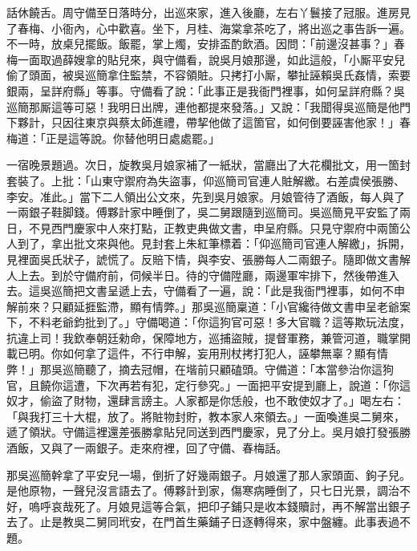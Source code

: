 話休饒舌。周守備至日落時分，出巡來家，進入後廳，左右丫鬟接了冠服。進房見了春梅、小衙內，心中歡喜。坐下，月桂、海棠拿茶吃了，將出巡之事告訴一遍。不一時，放桌兒擺飯。飯罷，掌上燭，安排盃酌飲酒。因問：「前邊沒甚事？」春梅一面取過薛嫂拿的貼兒來，與守備看，說吳月娘那邊，如此這般，「小厮平安兒偷了頭面，被吳巡簡拿住監禁，不容領賍。只拷打小厮，攀扯誣賴吳氏姦情，索要銀兩，呈詳府縣」等事。守備看了說：「此事正是我衙門裡事，如何呈詳府縣？吳巡簡那厮這等可惡！我明日出牌，連他都提來發落。」又說：「我聞得吳巡簡是他門下夥計，只因往東京與蔡太師進禮，帶挈他做了這箇官，如何倒要誣害他家！」春梅道：「正是這等說。你替他明日處處罷。」

一宿晚景題過。次日，旋教吳月娘家補了一紙狀，當廳出了大花欄批文，用一箇封套裝了。上批：「山東守禦府為失盜事，仰巡簡司官連人賍解繳。右差虞侯張勝、李安。准此。」當下二人領出公文來，先到吳月娘家。月娘管待了酒飯，每人與了一兩銀子鞋脚錢。傅夥計家中睡倒了，吳二舅跟隨到巡簡司。吳巡簡見平安監了兩日，不見西門慶家中人來打點，正教吏典做文書，申呈府縣。只見守禦府中兩箇公人到了，拿出批文來與他。見封套上朱紅筆標着：「仰巡簡司官連人解繳」，拆開，見裡面吳氏狀子，諕慌了。反賠下情，{}與李安、張勝每人二兩銀子。隨即做文書解人上去。到於守備府前，伺候半日。待的守備陞廳，兩邊軍牢排下，然後帶進入去。這吳巡簡把文書呈遞上去，守備看了一遍，說：「此是我衙門裡事，如何不申解前來？只顧延捱監滯，顯有情弊。」那吳巡簡稟道：「小官纔待做文書申呈老爺案下，不料老爺鈞批到了。」守備喝道：「你這狗官可惡！多大官職？這等欺玩法度，抗違上司！我欽奉朝廷勑命，保障地方，巡捕盜賊，提督軍務，兼管河道，職掌開載已明。你如何拿了這件，不行申解，妄用刑杖拷打犯人，誣攀無辜？顯有情弊！」那吳巡簡聽了，摘去冠帽，在堦前只顧磕頭。守備道：「本當參治你這狗官，且饒你這遭，下次再若有犯，定行參究。」{}一面把平安提到廳上，說道：「你這奴才，偷盜了財物，還肆言謗主。人家都是你恁般，也不敢使奴才了。」喝左右：「與我打三十大棍，放了。將賍物封貯，教本家人來領去。」一面喚進吳二舅來，遞了領狀。守備這裡還差張勝拿貼兒同送到西門慶家，見了分上。吳月娘打發張勝酒飯，又與了一兩銀子。走來府裡，回了守備、春梅話。

那吳巡簡幹拿了平安兒一場，倒折了好幾兩銀子。月娘還了那人家頭面、鉤子兒。是他原物，一聲兒沒言語去了。傅夥計到家，傷寒病睡倒了，只七日光景，調治不好，嗚呼哀哉死了。{}月娘見這等合氣，把印子鋪只是收本錢贖討，再不解當出銀子去了。止是教吳二舅同玳安，在門首生藥鋪子日逐轉得來，家中盤纏。此事表過不題。

